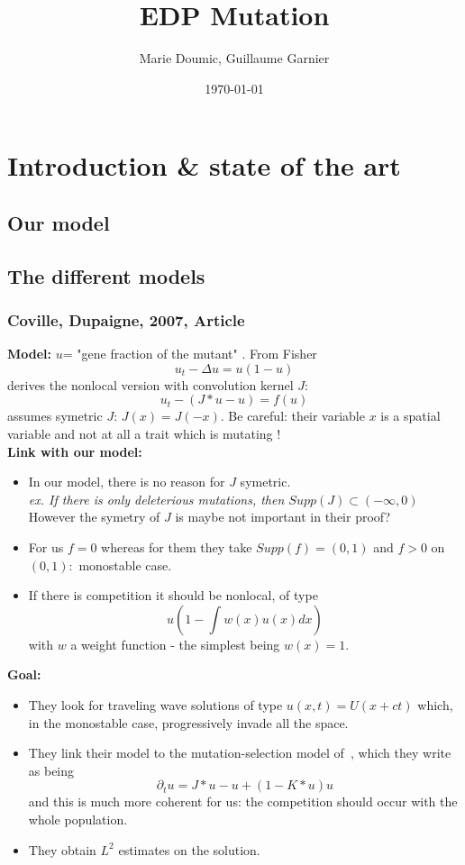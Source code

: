 \documentclass{article}
\title{EDP Mutation}
\author{Marie Doumic, Guillaume Garnier}
\date{\today}
\newcommand{\p}{\partial}
\begin{document}
\maketitle

\section{Introduction \& state of the art}

\subsection{Our model}

\subsection{The different models}

\subsubsection{Coville, Dupaigne, 2007, Article~\cite{coville2007non}}
\noindent\textbf{Model:} 
$u$= "gene fraction of the mutant" . From Fisher
\[u_t-\Delta u=u(1-u)
\]
derives the nonlocal version with convolution kernel $J$:
\[u_t- (J*u-u)=f(u)\]
assumes symetric $J$: $J(x)=J(-x)$.  Be careful: their variable $x$
is a spatial variable and not at all a trait which is mutating ! \\

\noindent\textbf{Link with our model:} 
\begin{itemize}
    \item In our model, there is no reason for $J$ symetric. \\
    \qquad \textit{ ex. If there is only deleterious mutations, then $Supp(J)\subset (-\infty, 0)$}\\
    However the symetry of $J$ is maybe not important in their proof?
    \item For us $f=0$ whereas for them they take $Supp(f)=(0,1)$ and $f>0$ on $(0,1):$ monostable case.
    \item If there is competition it should be nonlocal, of type $$u(1-\int w(x)u(x)dx)$$ with $w$ a weight function - the simplest being $w(x)=1$.
\end{itemize}

\noindent\textbf{Goal:} 
\begin{itemize}
    \item They look for traveling wave solutions of type $u(x,t)=U(x+ct)$ which, in the monostable case, progressively invade all the space.
    \item They link their model to the  mutation-selection model of~\cite{fourniermeleard}, which they write as being
    \[\p_t u=J*u-u +(1-K*u)u \]
    and this is much more coherent for us: the competition should occur with the whole population.
    \item They obtain $L^2$ estimates on the solution.
\end{itemize}
\end{document}
